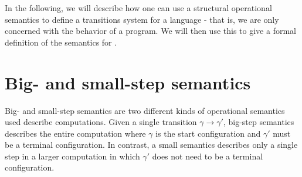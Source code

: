 In the following, we will describe how one can use a structural operational semantics to define a transitions system for a language - that is, we are only concerned with the behavior of a program.
We will then use this to give a formal definition of the semantics for \dazel{}.

\section{Big- and small-step semantics}
Big- and small-step semantics are two different kinds of operational semantics used describe computations.
Given a single transition $\gamma \rightarrow \gamma' $, big-step semantics describes the entire computation where $\gamma$ is the start configuration and $\gamma'$ must be a terminal configuration. 
In contrast, a small semantics describes only a single step in a larger computation in which $\gamma'$ does not need to be a terminal configuration. 
